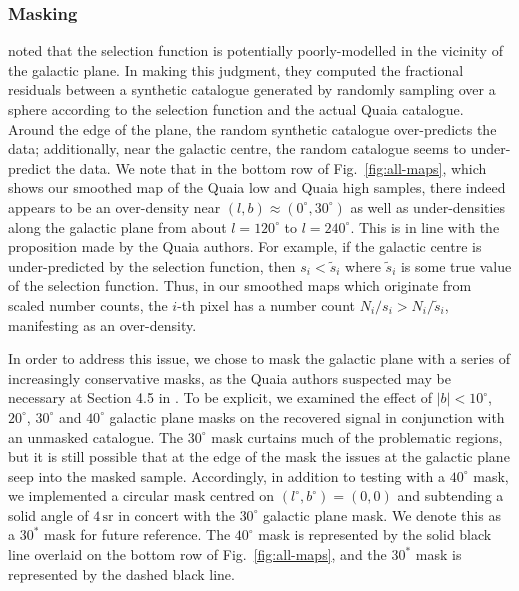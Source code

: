 \documentclass[fleqn,usenatbib]{mnras}
\begin{document}
    \subsubsection{Masking}
    \label{subs:masking}
        \citet{storeyfisher2023quaia} noted that the selection function is potentially poorly-modelled in the vicinity of the galactic plane.
        In making this judgment, they computed the fractional residuals between a synthetic catalogue generated by randomly sampling over a sphere according to the selection function and the actual Quaia catalogue.
        Around the edge of the plane, the random synthetic catalogue over-predicts the data; additionally, near the galactic centre, the random catalogue seems to under-predict the data.
        We note that in the bottom row of Fig.~\ref{fig:all-maps}, which shows our smoothed map of the Quaia low and Quaia high samples, there indeed appears to be an over-density near $(l,b) \approx (0^\circ, 30^\circ)$ as well as under-densities along the galactic plane from about $l = 120^\circ$ to $l = 240^\circ$. 
        This is in line with the proposition made by the Quaia authors.
        For example, if the galactic centre is under-predicted by the selection function, then $s_i < \tilde{s}_i$ where $\tilde{s}_i$ is some true value of the selection function.
        Thus, in our smoothed maps which originate from scaled number counts, the $i$-th pixel has a number count $N_i / s_i > N_i / \tilde{s}_i$, manifesting as an over-density.
        
        In order to address this issue, we chose to mask the galactic plane with a series of increasingly conservative masks, as the Quaia authors suspected may be necessary at Section 4.5 in \citet{storeyfisher2023quaia}.
        To be explicit, we examined the effect of $|b| < 10^\circ$, $20^\circ$, $30^\circ$ and $40^\circ$ galactic plane masks on the recovered signal in conjunction with an unmasked catalogue. 
        The $30^\circ$ mask curtains much of the problematic regions, but it is still possible that at the edge of the mask the issues at the galactic plane seep into the masked sample.
        Accordingly, in addition to testing with a $40^\circ$ mask, we implemented a circular mask centred on $(l^\circ, b^\circ)=(0,0)$ and subtending a solid angle of $4\,\text{sr}$ in concert with the $30^\circ$ galactic plane mask.
        We denote this as a $30^*$ mask for future reference.
        The $40^\circ$ mask is represented by the solid black line overlaid on the bottom row of Fig.~\ref{fig:all-maps}, and the $30^*$ mask is represented by the dashed black line.
        
\end{document}
